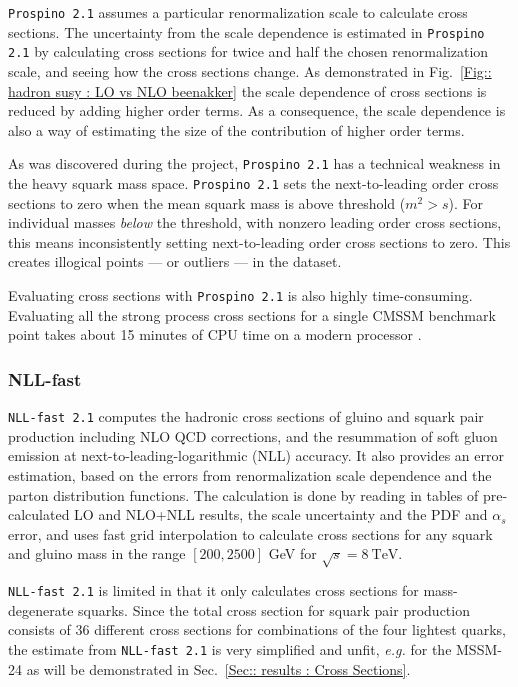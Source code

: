 \documentclass[twoside,english]{uiofysmaster}
\begin{document}
{{\verb|Prospino 2.1| assumes a particular renormalization scale to calculate cross sections. The uncertainty from the scale dependence is estimated in \verb|Prospino 2.1| by calculating cross sections for twice and half the chosen renormalization scale, and seeing how the cross sections change. As demonstrated in Fig.~\ref{Fig:: hadron susy : LO vs NLO beenakker} the scale dependence of cross sections is reduced by adding higher order terms. As a consequence, the scale dependence is also a way of estimating the size of the contribution of higher order terms. 


As was discovered during the project, \verb|Prospino 2.1| has a technical weakness in the heavy squark mass space. \verb|Prospino 2.1| sets the next-to-leading order cross sections to zero when the mean squark mass is above threshold ($m^2 > s$). For individual masses \textit{below} the threshold, with nonzero leading order cross sections, this means inconsistently setting next-to-leading order cross sections to zero. This creates illogical points --- or outliers --- in the dataset.

Evaluating cross sections with \verb|Prospino 2.1| is also highly time-consuming. Evaluating all the strong process cross sections for a single CMSSM benchmark point takes about 15 minutes of CPU time on a modern processor \cite{Balazs:2017moi}. 


\subsubsection{NLL-fast}

\verb|NLL-fast 2.1| \cite{Beenakker:1996ch, Kulesza:2008jb, Kulesza:2009kq, Beenakker:2009ha, Beenakker:2011fu} computes the hadronic cross sections of gluino and squark pair production including NLO QCD corrections, and the resummation of soft gluon emission at next-to-leading-logarithmic (NLL) accuracy. It also provides an error estimation, based on the errors from renormalization scale dependence and the parton distribution functions. The calculation is done by reading in tables of pre-calculated LO and NLO+NLL results, the scale uncertainty and the PDF and $\alpha_s$ error, and uses fast grid interpolation to calculate cross sections for any squark and gluino mass in the range $[200, 2500]$ GeV for $\sqrt{s}=8~\mathrm{TeV}$. 

\verb|NLL-fast 2.1| is limited in that it only calculates cross sections for mass-degenerate squarks. Since the total cross section for squark pair production consists of 36 different cross sections for combinations of the four lightest quarks, the estimate from \verb|NLL-fast 2.1| is very simplified and unfit, \textit{e.g.} for the MSSM-24 as will be demonstrated in Sec.~\ref{Sec:: results : Cross Sections}.

}}
\end{document}
